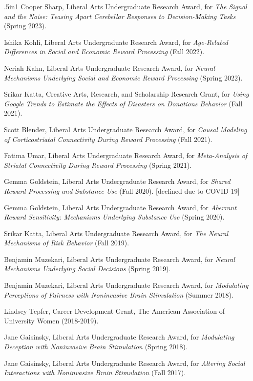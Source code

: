 \documentclass[11pt, letterpaper]{article}
\begin{document}
\begin{hangparas}{.5in}{1}
Cooper Sharp, Liberal Arts Undergraduate Research Award, for \textit{The Signal and the Noise: Teasing Apart Cerebellar Responses to Decision-Making Tasks} (Spring 2023).

Ishika Kohli, Liberal Arts Undergraduate Research Award, for \textit{Age-Related Differences in Social and Economic Reward Processing} (Fall 2022).

Neriah Kahn, Liberal Arts Undergraduate Research Award, for \textit{Neural Mechanisms Underlying Social and Economic Reward Processing} (Spring 2022).

Srikar Katta, Creative Arts, Research, and Scholarship Research Grant, for \textit{Using Google Trends to Estimate the Effects of Disasters on Donations Behavior} (Fall 2021).

Scott Blender, Liberal Arts Undergraduate Research Award, for \textit{Causal Modeling of Corticostriatal Connectivity During Reward Processing} (Fall 2021).

Fatima Umar, Liberal Arts Undergraduate Research Award, for \textit{Meta-Analysis of Striatal Connectivity During Reward Processing} (Spring 2021).

Gemma Goldstein, Liberal Arts Undergraduate Research Award, for \textit{Shared Reward Processing and Substance Use} (Fall 2020). [declined due to COVID-19]

Gemma Goldstein, Liberal Arts Undergraduate Research Award, for \textit{Aberrant Reward Sensitivity: Mechanisms Underlying Substance Use} (Spring 2020). 

Srikar Katta, Liberal Arts Undergraduate Research Award, for \textit{The Neural Mechanisms of Risk Behavior} (Fall 2019).

Benjamin Muzekari, Liberal Arts Undergraduate Research Award, for \textit{Neural Mechanisms Underlying Social Decisions} (Spring 2019).

Benjamin Muzekari, Liberal Arts Undergraduate Research Award, for \textit{Modulating Perceptions of Fairness with Noninvasive Brain Stimulation} (Summer 2018).

Lindsey Tepfer, Career Development Grant, The American Association of University Women (2018-2019).

Jane Gaisinsky, Liberal Arts Undergraduate Research Award, for \textit{Modulating Deception with Noninvasive Brain Stimulation} (Spring 2018).

Jane Gaisinsky, Liberal Arts Undergraduate Research Award, for \textit{Altering Social Interactions with Noninvasive Brain Stimulation} (Fall 2017). \\

\end{hangparas}
\end{document}

